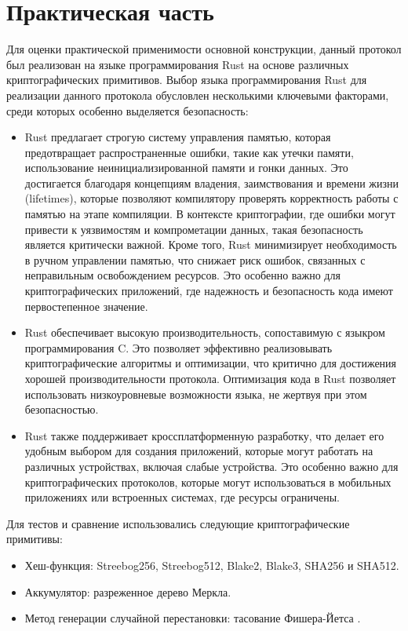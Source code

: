 \chapter{Практическая часть}
Для оценки практической применимости основной конструкции, данный протокол был реализован на языке программирования Rust на основе различных криптографических примитивов.
Выбор языка программирования Rust для реализации данного протокола обусловлен несколькими ключевыми факторами, среди которых особенно выделяется безопасность:
\begin{itemize}
	\item Rust предлагает строгую систему управления памятью, которая предотвращает распространенные ошибки, такие как утечки памяти, использование неинициализированной памяти и гонки данных. Это достигается благодаря концепциям владения, заимствования и времени жизни (lifetimes), которые позволяют компилятору проверять корректность работы с памятью на этапе компиляции. В контексте криптографии, где ошибки могут привести к уязвимостям и компрометации данных, такая безопасность является критически важной. Кроме того, Rust минимизирует необходимость в ручном управлении памятью, что снижает риск ошибок, связанных с неправильным освобождением ресурсов. Это особенно важно для криптографических приложений, где надежность и безопасность кода имеют первостепенное значение.
	\item Rust обеспечивает высокую производительность, сопоставимую с языкром программирования C. Это позволяет эффективно реализовывать криптографические алгоритмы и оптимизации, что критично для достижения хорошей производительности протокола. Оптимизация кода в Rust позволяет использовать низкоуровневые возможности языка, не жертвуя при этом безопасностью.
	\item Rust также поддерживает кроссплатформенную разработку, что делает его удобным выбором для создания приложений, которые могут работать на различных устройствах, включая слабые устройства. Это особенно важно для криптографических протоколов, которые могут использоваться в мобильных приложениях или встроенных системах, где ресурсы ограничены.
\end{itemize}

Для тестов и сравнение использовались следующие криптографические примитивы:
\begin{itemize}
	\item Хеш-функция: Streebog256, Streebog512, Blake2, Blake3, SHA256 и SHA512.
	\item Аккумулятор: разреженное дерево Меркла.
	\item Метод генерации случайной перестановки: тасование Фишера-Йетса \cite{10.1145/364520.364540}.
\end{itemize}

